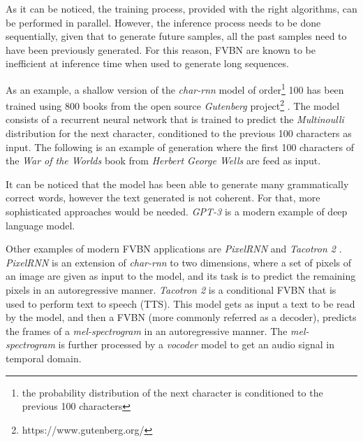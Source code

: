 As it can be noticed, the training process, provided with the right algorithms, can be performed in parallel. However, the inference process needs to be done sequentially, given that to generate future samples, all the past samples need to have been previously generated. For this reason, FVBN are known to be inefficient at inference time when used to generate long sequences.

As an example, a shallow version of the \textit{char-rnn} model of order\footnote{the probability distribution of the next character is conditioned to the previous 100 characters} 100 has been trained using 800 books from the open source \textit{Gutenberg} project\footnote{https://www.gutenberg.org/} \autocite{gerlach2020}. The model consists of a recurrent neural network that is trained to predict the \textit{Multinoulli} distribution for the next character, conditioned to the previous 100 characters as input. The following is an example of generation where the first 100 characters of the \textit{War of the Worlds} book from \textit{Herbert George Wells} are feed as input.


It can be noticed that the model has been able to generate many grammatically correct words, however the text generated is not coherent. For that, more sophisticated approaches would be needed. \textit{GPT-3} \autocite{floridi2020} is a modern example of deep language model.

Other examples of modern FVBN applications are \textit{PixelRNN} and \textit{Tacotron 2} \autocite{Wang2017,Shen2018,liu2019b}. \textit{PixelRNN} \autocite{Oord2016, Oord2016b} is an extension of \textit{char-rnn} to two dimensions, where a set of pixels of an image are given as input to the model, and its task is to predict the remaining pixels in an autoregressive manner. \textit{Tacotron 2} is a conditional FVBN that is used to perform text to speech (TTS). This model gets as input a text to be read by the model, and then a FVBN (more commonly referred as a decoder), predicts the frames of a \textit{mel-spectrogram} in an autoregressive manner. The \textit{mel-spectrogram} is further processed by a \textit{vocoder} model \autocite{vanderoord2016, lorenzotrueba2019} to get an audio signal in temporal domain.

